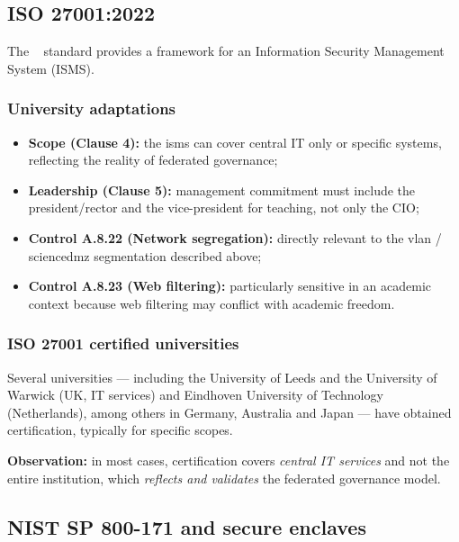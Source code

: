 \subsection{ISO 27001:2022}

The ~\cite{iso27001} standard provides a
framework for an Information Security Management System (ISMS).

\subsubsection{University adaptations}

\begin{itemize}
    \item \textbf{Scope (Clause 4):} the \gls{isms} can cover central IT
    only or specific systems, reflecting the reality
    of federated governance;
    \item \textbf{Leadership (Clause 5):} management commitment
    must include the president/rector and the vice-president for teaching,
    not only the CIO;
    \item \textbf{Control A.8.22 (Network segregation):} directly
    relevant to the \gls{vlan} / \gls{sciencedmz} segmentation described above;
    \item \textbf{Control A.8.23 (Web filtering):} particularly
    sensitive in an academic context because web filtering may conflict
    with academic freedom.
\end{itemize}

\subsubsection{ISO 27001 certified universities}

Several universities --- including the University of Leeds and the
University of Warwick (UK, IT services) and Eindhoven University of
Technology (Netherlands), among others in Germany, Australia and
Japan --- have obtained certification, typically for specific scopes.

\textbf{Observation:} in most cases, certification covers
\emph{central IT services} and not the entire institution, which
\emph{reflects and validates} the federated governance model.

\subsection{NIST SP 800-171 and secure enclaves}

